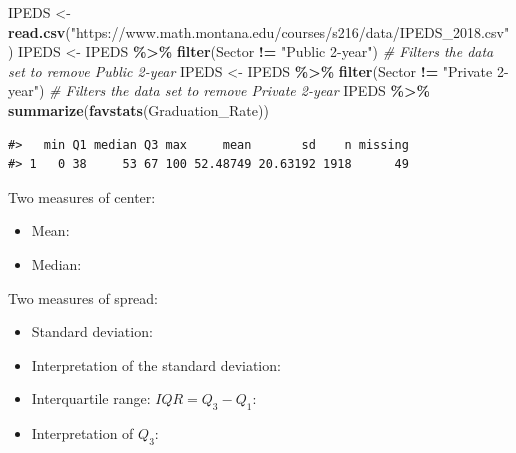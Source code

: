 \documentclass[
]{report}
\newenvironment{Shaded}{\begin{snugshade}}{\end{snugshade}}
\newcommand{\CommentTok}[1]{\textcolor[rgb]{0.56,0.35,0.01}{\textit{#1}}}
\newcommand{\FunctionTok}[1]{\textcolor[rgb]{0.13,0.29,0.53}{\textbf{#1}}}
\newcommand{\NormalTok}[1]{#1}
\newcommand{\OtherTok}[1]{\textcolor[rgb]{0.56,0.35,0.01}{#1}}
\newcommand{\SpecialCharTok}[1]{\textcolor[rgb]{0.81,0.36,0.00}{\textbf{#1}}}
\newcommand{\StringTok}[1]{\textcolor[rgb]{0.31,0.60,0.02}{#1}}
\providecommand{\tightlist}{%
  \setlength{\itemsep}{0pt}\setlength{\parskip}{0pt}}
\begin{document}
\begin{Shaded}
\begin{Highlighting}[]
\NormalTok{IPEDS }\OtherTok{\textless{}{-}} \FunctionTok{read.csv}\NormalTok{(}\StringTok{"https://www.math.montana.edu/courses/s216/data/IPEDS\_2018.csv"}\NormalTok{) }
\NormalTok{IPEDS }\OtherTok{\textless{}{-}}\NormalTok{ IPEDS }\SpecialCharTok{\%\textgreater{}\%}
  \FunctionTok{filter}\NormalTok{(Sector }\SpecialCharTok{!=} \StringTok{"Public 2{-}year"}\NormalTok{) }\CommentTok{\# Filters the data set to remove Public 2{-}year}
\NormalTok{IPEDS }\OtherTok{\textless{}{-}}\NormalTok{ IPEDS }\SpecialCharTok{\%\textgreater{}\%}
  \FunctionTok{filter}\NormalTok{(Sector }\SpecialCharTok{!=} \StringTok{"Private 2{-}year"}\NormalTok{) }\CommentTok{\# Filters the data set to remove Private 2{-}year}
\NormalTok{IPEDS }\SpecialCharTok{\%\textgreater{}\%}
    \FunctionTok{summarize}\NormalTok{(}\FunctionTok{favstats}\NormalTok{(Graduation\_Rate))}
\end{Highlighting}
\end{Shaded}

\begin{verbatim}
#>   min Q1 median Q3 max     mean       sd    n missing
#> 1   0 38     53 67 100 52.48749 20.63192 1918      49
\end{verbatim}

Two measures of center:

\begin{itemize}
\item
  Mean:
\item
  Median:
\end{itemize}

Two measures of spread:

\begin{itemize}
\item
  Standard deviation:
\item
  Interpretation of the standard deviation:
\end{itemize}

\vspace{0.8in}

\begin{itemize}
\tightlist
\item
  Interquartile range: \(IQR = Q_3 - Q_1\):
\end{itemize}

\vspace{0.5in}

\begin{itemize}
\tightlist
\item
  Interpretation of \(Q_3\):
\end{itemize}
\end{document}
